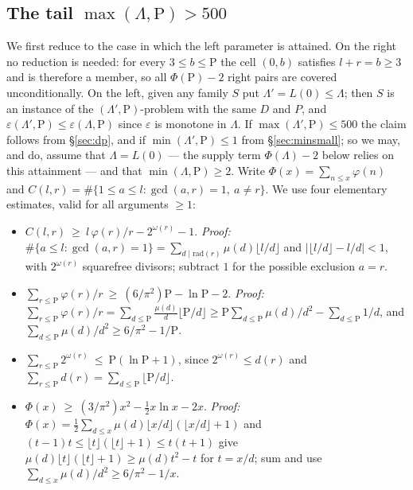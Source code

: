 \documentclass[11pt]{article}
\theoremstyle{definition}
\begin{document}
\subsection{The tail $\max(\Lambda,\mathrm{P})>500$}\label{subsec:tail}
We first reduce to the case in which the left parameter is attained. On the right no reduction is needed: for every $3\le b\le\mathrm{P}$ the cell $(0,b)$ satisfies $l+r=b\ge3$ and is therefore a member, so all $\Phi(\mathrm{P})-2$ right pairs are covered unconditionally. On the left, given any family $S$ put $\Lambda'=L(0)\le\Lambda$; then $S$ is an instance of the $(\Lambda',\mathrm{P})$-problem with the same $D$ and $P$, and $\varepsilon(\Lambda',\mathrm{P})\le\varepsilon(\Lambda,\mathrm{P})$ since $\varepsilon$ is monotone in $\Lambda$. If $\max(\Lambda',\mathrm{P})\le500$ the claim follows from \S\ref{sec:dp}, and if $\min(\Lambda',\mathrm{P})\le1$ from \S\ref{sec:minsmall}; so we may, and do, assume that $\Lambda=L(0)$ --- the supply term $\Phi(\Lambda)-2$ below relies on this attainment --- and that $\min(\Lambda,\mathrm{P})\ge2$. Write $\Phi(x)=\sum_{n\le x}\varphi(n)$ and $C(l,r)=\#\{1\le a\le l:\gcd(a,r)=1,\ a\ne r\}$. We use four elementary estimates, valid for all arguments $\ge 1$:
\begin{itemize}
\item[(E1)] $C(l,r)\ \ge\ l\,\varphi(r)/r-2^{\omega(r)}-1$. \emph{Proof:} $\#\{a\le l:\gcd(a,r)=1\}=\sum_{d\mid \mathrm{rad}(r)}\mu(d)\lfloor l/d\rfloor$ and $|\lfloor l/d\rfloor-l/d|<1$, with $2^{\omega(r)}$ squarefree divisors; subtract $1$ for the possible exclusion $a=r$.
\item[(E2)] $\sum_{r\le \mathrm{P}}\varphi(r)/r\ \ge\ (6/\pi^2)\mathrm{P}-\ln \mathrm{P}-2$. \emph{Proof:} $\sum_{r\le \mathrm{P}}\varphi(r)/r=\sum_{d\le \mathrm{P}}\frac{\mu(d)}{d}\lfloor \mathrm{P}/d\rfloor\ge \mathrm{P}\sum_{d\le \mathrm{P}}\mu(d)/d^2-\sum_{d\le \mathrm{P}}1/d$, and $\sum_{d\le \mathrm{P}}\mu(d)/d^2\ge 6/\pi^2-1/\mathrm{P}$.
\item[(E3)] $\sum_{r\le \mathrm{P}}2^{\omega(r)}\ \le\ \mathrm{P}(\ln \mathrm{P}+1)$, since $2^{\omega(r)}\le d(r)$ and $\sum_{r\le \mathrm{P}}d(r)=\sum_{d\le \mathrm{P}}\lfloor \mathrm{P}/d\rfloor$.
\item[(E4)] $\Phi(x)\ \ge\ (3/\pi^2)x^2-\tfrac12 x\ln x-2x$. \emph{Proof:} $\Phi(x)=\tfrac12\sum_{d\le x}\mu(d)\lfloor x/d\rfloor(\lfloor x/d\rfloor+1)$ and $(t-1)t\le\lfloor t\rfloor(\lfloor t\rfloor+1)\le t(t+1)$ give $\mu(d)\lfloor t\rfloor(\lfloor t\rfloor+1)\ge \mu(d)t^2-t$ for $t=x/d$; sum and use $\sum_{d\le x}\mu(d)/d^2\ge 6/\pi^2-1/x$.
\end{itemize}
\end{document}
